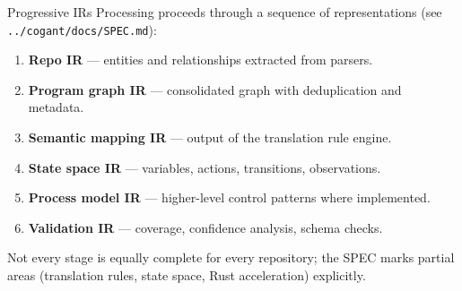 \documentclass[
  ignorenonframetext,
]{beamer}
\providecommand{\tightlist}{%
  \setlength{\itemsep}{0pt}\setlength{\parskip}{0pt}}
\begin{document}
\begin{frame}[fragile]{Progressive IRs}
\protect{}\label{progressive-irs}
Processing proceeds through a sequence of representations (see
\texttt{../cogant/docs/SPEC.md}):

\begin{enumerate}
\tightlist
\item
  \textbf{Repo IR} --- entities and relationships extracted from
  parsers.
\item
  \textbf{Program graph IR} --- consolidated graph with deduplication
  and metadata.
\item
  \textbf{Semantic mapping IR} --- output of the translation rule
  engine.
\item
  \textbf{State space IR} --- variables, actions, transitions,
  observations.
\item
  \textbf{Process model IR} --- higher-level control patterns where
  implemented.
\item
  \textbf{Validation IR} --- coverage, confidence analysis, schema
  checks.
\end{enumerate}

Not every stage is equally complete for every repository; the SPEC marks
partial areas (translation rules, state space, Rust acceleration)
explicitly.
\end{frame}
\end{document}
